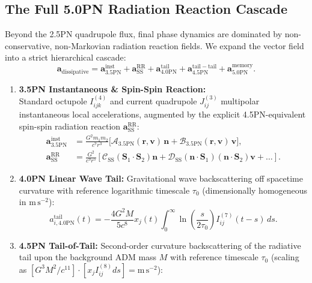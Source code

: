 \documentclass[11pt,a4paper,reqno]{article}
\theoremstyle{plain}
\theoremstyle{definition}
\theoremstyle{remark}
\numberwithin{equation}{section}
\begin{document}
\subsection{The Full 5.0PN Radiation Reaction Cascade}
Beyond the 2.5PN quadrupole flux, final phase dynamics are dominated by non-conservative, non-Markovian radiation reaction fields. We expand the vector field into a strict hierarchical cascade:
\begin{equation}
\label{eq:diss_field_cascade}
\bm{a}_{\mathrm{dissipative}} = \bm{a}_{3.5\mathrm{PN}}^{\mathrm{inst}} + \bm{a}_{\mathrm{SS}}^{\mathrm{RR}} + \bm{a}_{4.0\mathrm{PN}}^{\mathrm{tail}} + \bm{a}_{4.5\mathrm{PN}}^{\mathrm{tail-tail}} + \bm{a}_{5.0\mathrm{PN}}^{\mathrm{memory}}.
\end{equation}
\begin{enumerate}
    \item \textbf{3.5PN Instantaneous \& Spin-Spin Reaction:}\\ Standard octupole $I_{ijk}^{(4)}$ and current quadrupole $J_{ij}^{(3)}$ multipolar instantaneous local accelerations, augmented by the explicit 4.5PN-equivalent spin-spin radiation reaction $\bm{a}_{\mathrm{SS}}^{\mathrm{RR}}$:
    \begin{align}
    \bm{a}_{3.5\mathrm{PN}}^{\mathrm{inst}} &= \frac{G^2 m_1 m_2}{c^7 r^3} \Big[ \mathcal{A}_{3.5\mathrm{PN}}(\bm{r}, \bm{v}) \, \bm{n} + \mathcal{B}_{3.5\mathrm{PN}}(\bm{r}, \bm{v}) \, \bm{v} \Big], \\
    \bm{a}_{\mathrm{SS}}^{\mathrm{RR}} &= \frac{G^2}{c^9 r^5} \left[ \mathcal{C}_{\mathrm{SS}}(\bm{S}_1 \cdot \bm{S}_2) \bm{n} + \mathcal{D}_{\mathrm{SS}} (\bm{n} \cdot \bm{S}_1)(\bm{n} \cdot \bm{S}_2) \bm{v} + \dots \right].
    \end{align}
    \item \textbf{4.0PN Linear Wave Tail:} Gravitational wave backscattering off spacetime curvature with reference logarithmic timescale $\tau_0$ (dimensionally homogeneous in $\mathrm{m}\,\mathrm{s}^{-2}$):
    \begin{equation}
    a_{i, 4.0\mathrm{PN}}^{\mathrm{tail}}(t) = -\frac{4 G^2 M}{5 c^8} x_j(t) \int_0^\infty \ln\left( \frac{s}{2 \tau_0} \right) I_{ij}^{(7)}(t - s) \, ds.
    \end{equation}
    \item \textbf{4.5PN Tail-of-Tail:} Second-order curvature backscattering of the radiative tail upon the background ADM mass $M$ with reference timescale $\tau_0$ (scaling as $[G^3 M^2 / c^{11}] \cdot [x_j I_{ij}^{(8)} ds] = \mathrm{m}\,\mathrm{s}^{-2}$):

\end{enumerate}
\end{document}
